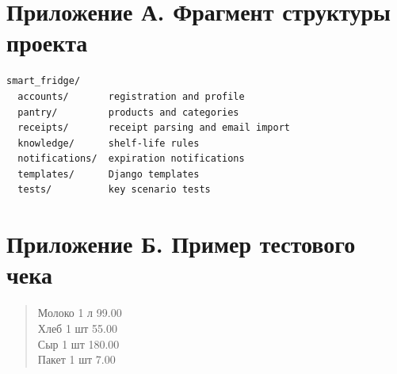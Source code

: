 \documentclass[14pt,a4paper]{extreport}
\begin{document}
\newpage
\applications

\section*{Приложение А. Фрагмент структуры проекта}

\begin{lstlisting}[basicstyle=\small\ttfamily,frame=single,breaklines=true]
smart_fridge/
  accounts/       registration and profile
  pantry/         products and categories
  receipts/       receipt parsing and email import
  knowledge/      shelf-life rules
  notifications/  expiration notifications
  templates/      Django templates
  tests/          key scenario tests
\end{lstlisting}

\section*{Приложение Б. Пример тестового чека}

\begin{quote}
\small\ttfamily
Молоко 1 л 99.00\\
Хлеб 1 шт 55.00\\
Сыр 1 шт 180.00\\
Пакет 1 шт 7.00
\end{quote}
\end{document}
